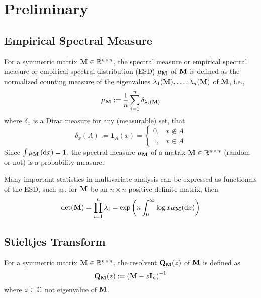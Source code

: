 \chapter{Preliminary}

\section{Empirical Spectral Measure}

\begin{definition}
	For a symmetric matrix \(\mathbf{M}\in\mathbb{R}^{n\times n}\), the spectral measure or empirical spectral measure or empirical spectral distribution (ESD) \(\mu_{\mathbf{M}}\) of \(\mathbf{M}\) is defined as the normalized counting measure of the eigenvalues \(\lambda_{1}(\mathbf{M}),\ldots,\lambda_{n}(\mathbf{M})\) of \(\mathbf{M}\), i.e.,
	\begin{equation}
		\mu_{\mathbf{M}}:=\frac{1}{n}\sum_{i=1}^{n}\delta_{\lambda_{i}(\mathbf{M})}
	\end{equation}
	where \(\delta_{x}\) is a Dirac measure for any (measurable) set, that
	\begin{equation*}
		\delta_{x}(A):=\mathbf{1}_{A}(x)=
		\begin{cases}
			0, & x\notin A \\
			1, & x\in A
		\end{cases}
	\end{equation*}
	Since \(\int\mu_{\mathbf{M}}\left(\mathop{}\!\mathrm{d} x\right)=1\), the spectral measure \(\mu_{\mathbf{M}}\) of a matrix \(\mathbf{M}\in\mathbb{R}^{n\times n}\) (random or not) is a probability measure.
\end{definition}

\begin{remark}
	Many important statistics in multivariate analysis can be expressed as functionals of the ESD, such as, for \(\mathbf{M}\) be an \(n\times n\) positive definite matrix, then
	\begin{equation}
		\det(\mathbf{M})=\prod_{i=1}^{n}\lambda_{i}=\exp\left(n\int_{0}^{\infty}\log x\mu_{\mathbf{M}}(\mathop{}\!\mathrm{d} x)\right)
	\end{equation}
\end{remark}

\section{Stieltjes Transform}

\begin{definition}[Resolvent]
	For a symmetric matrix \(\mathbf{M}\in\mathbb{R}^{n\times n}\), the resolvent \(\mathbf{Q}_{\mathbf{M}}(z)\) of \(\mathbf{M}\) is defined as
	\begin{equation}
		\mathbf{Q}_{\mathbf{M}}(z):=\left(\mathbf{M}-z\mathbf{I}_{n}\right)^{-1}
	\end{equation}
	where \(z\in\mathbb{C}\) not eigenvalue of \(\mathbf{M}\).
\end{definition}

